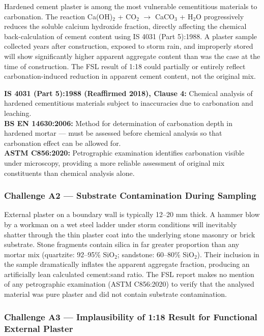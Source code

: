 \documentclass[12pt, a4paper]{article}
\begin{document}
Hardened cement plaster is among the most vulnerable cementitious materials to carbonation. The reaction Ca(OH)$_2$ + CO$_2$ $\rightarrow$ CaCO$_3$ + H$_2$O progressively reduces the soluble calcium hydroxide fraction, directly affecting the chemical back-calculation of cement content using IS 4031 (Part 5):1988. A plaster sample collected years after construction, exposed to storm rain, and improperly stored will show significantly higher apparent aggregate content than was the case at the time of construction. The FSL result of 1:18 could partially or entirely reflect carbonation-induced reduction in apparent cement content, not the original mix.

\begin{standardbox}
\textbf{IS 4031 (Part 5):1988 (Reaffirmed 2018), Clause 4:} Chemical analysis of hardened cementitious materials subject to inaccuracies due to carbonation and leaching.\\
\textbf{BS EN 14630:2006:} Method for determination of carbonation depth in hardened mortar --- must be assessed before chemical analysis so that carbonation effect can be allowed for.\\
\textbf{ASTM C856:2020:} Petrographic examination identifies carbonation visible under microscopy, providing a more reliable assessment of original mix constituents than chemical analysis alone.
\end{standardbox}

\subsubsection{Challenge A2 --- Substrate Contamination During Sampling}

External plaster on a boundary wall is typically 12--20 mm thick. A hammer blow by a workman on a wet steel ladder under storm conditions will inevitably shatter through the thin plaster coat into the underlying stone masonry or brick substrate. Stone fragments contain silica in far greater proportion than any mortar mix (quartzite: 92--95\% SiO$_2$; sandstone: 60--80\% SiO$_2$). Their inclusion in the sample dramatically inflates the apparent aggregate fraction, producing an artificially lean calculated cement:sand ratio. The FSL report makes no mention of any petrographic examination (ASTM C856:2020) to verify that the analysed material was pure plaster and did not contain substrate contamination.

\subsubsection{Challenge A3 --- Implausibility of 1:18 Result for Functional External Plaster}
\end{document}
